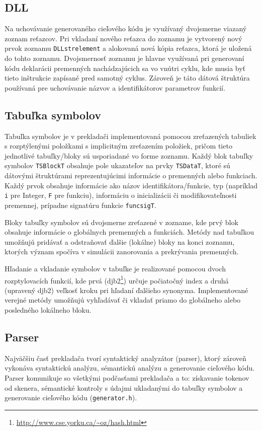 \documentclass[a4paper,11pt]{article}
\begin{document}
\subsection{DLL}
Na uchovávanie generovaného cieľového kódu je využívaný dvojsmerne viazaný zoznam reťazcov. Pri vkladaní nového reťazca do zoznamu je vytvorený nový prvok zoznamu \texttt{DLLstr\textunderscore element} a alokovaná nová kópia reťazca, ktorá je uložená do tohto zoznamu. Dvojsmernosť zoznamu je hlavne využívaná pri generovaní kódu deklarácii premenných nachádzajúcich sa vo vnútri cyklu, kde musia byť tieto inštrukcie zapísané pred samotný cyklus. Zároveň je táto dátová štruktúra používaná pre uchovávanie názvov a identifikátorov parametrov funkcií.

\subsection{Tabuľka symbolov}
Tabuľka symbolov je v prekladači implementovaná pomocou zreťazených tabuliek s rozptýlenými položkami s implicitným zreťazením položiek, pričom tieto jednotlivé tabuľky/bloky sú usporiadané vo forme zoznamu. Každý blok tabuľky symbolov \texttt{TSBlock\textunderscore T} obsahuje pole ukazateľov na prvky \texttt{TSData\textunderscore T}, ktoré sú dátovými štruktúrami reprezentujúcimi informácie o premenných alebo funkciach. Každý prvok obsahuje informácie ako názov identifikátora/funkcie, typ (napríklad \texttt{i} pre Integer, \texttt{F} pre funkciu), informáciu o inicializácii či modifikovateľnosti premennej, prípadne signatúru funkcie \texttt{func\textunderscore sig\textunderscore T}.

Bloky tabuľky symbolov sú dvojsmerne zreťazené v zozname, kde prvý blok obsahuje informácie o globálnych premenných a funkciách. Metódy nad tabuľkou umožňujú pridávať a odstraňovať ďalšie (lokálne) bloky na konci zoznamu, ktorých význam spočíva v simulácii zanorovania a prekrývania premenných.

Hľadanie a vkladanie symbolov v tabuľke je realizované pomocou dvoch rozptylovacích funkcií, kde prvá (djb2\footnote{\url{http://www.cse.yorku.ca/~oz/hash.html}}) určuje počiatočný index a druhá (upravený djb2) veľkosť kroku pri hľadaní ďalšieho synonyma. Implementované verejné metódy umožňujú vyhľadávať či vkladať priamo do globálneho alebo posledného lokálneho bloku.


\subsection{Parser}
Najväčšiu časť prekladača tvorí syntaktický analyzátor (parser), ktorý zároveň vykonáva syntaktickú analýzu, sémantickú analýzu a generovanie cieľového kódu. Parser komunikuje so všetkými podčasťami prekladača a to: získavanie tokenov od skenera, sémantické kontroly s údajmi ukladanými do tabuľky symbolov a generovanie cieľového kódu (\texttt{generator.h}).
\end{document}
